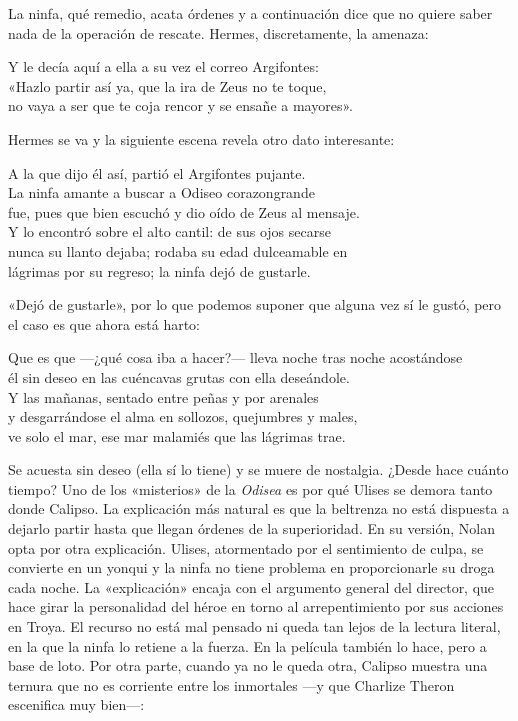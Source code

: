 La ninfa, qué remedio, acata órdenes y a continuación dice que no quiere saber nada de la operación de rescate. Hermes, discretamente, la amenaza:

\begin{versocita}
Y le decía aquí a ella a su vez el correo Argifontes:\\
«Hazlo partir así ya, que la ira de Zeus no te toque,\\
no vaya a ser que te coja rencor y se ensañe a mayores».
\end{versocita}

Hermes se va y la siguiente escena revela otro dato interesante:

\begin{versocita}
A la que dijo él así, partió el Argifontes pujante.\\
La ninfa amante a buscar a Odiseo corazongrande\\
fue, pues que bien escuchó y dio oído de Zeus al mensaje.\\
Y lo encontró sobre el alto cantil: de sus ojos secarse\\
nunca su llanto dejaba; rodaba su edad dulceamable en\\
lágrimas por su regreso; la ninfa dejó de gustarle.
\end{versocita}

«Dejó de gustarle», por lo que podemos suponer que alguna vez sí le gustó, pero el caso es que ahora está harto:

\begin{versocita}
Que es que ---¿qué cosa iba a hacer?--- lleva noche tras noche acostándose\\
él sin deseo en las cuéncavas grutas con ella deseándole.\\
Y las mañanas, sentado entre peñas y por arenales\\
y desgarrándose el alma en sollozos, quejumbres y males,\\
ve solo el mar, ese mar malamiés que las lágrimas trae.
\end{versocita}

Se acuesta sin deseo (ella sí lo tiene) y se muere de nostalgia. ¿Desde hace cuánto tiempo? Uno de los «misterios» de la \emph{Odisea} es por qué Ulises se demora tanto donde Calipso. La explicación más natural es que la beltrenza no está dispuesta a dejarlo partir hasta que llegan órdenes de la superioridad. En su versión, Nolan opta por otra explicación. Ulises, atormentado por el sentimiento de culpa, se convierte en un yonqui y la ninfa no tiene problema en proporcionarle su droga cada noche. La «explicación» encaja con el argumento general del director, que hace girar la personalidad del héroe en torno al arrepentimiento por sus acciones en Troya. El recurso no está mal pensado ni queda tan lejos de la lectura literal, en la que la ninfa lo retiene a la fuerza. En la película también lo hace, pero a base de loto. Por otra parte, cuando ya no le queda otra, Calipso muestra una ternura que no es corriente entre los inmortales ---y que Charlize Theron escenifica muy bien---:

